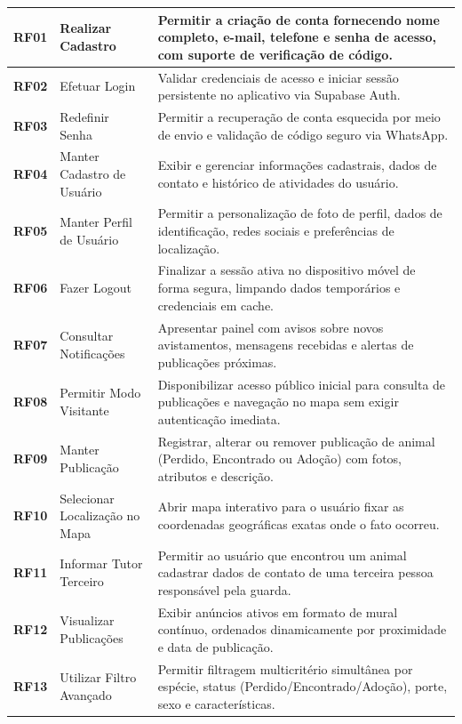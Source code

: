{\begin{longtable}{|>{\centering\arraybackslash}p{1.3cm}|>{\raggedright\arraybackslash}p{4.2cm}|>{\raggedright\arraybackslash}p{8.8cm}|}
\textbf{RF01} & Realizar Cadastro & Permitir a criação de conta fornecendo nome completo, e-mail, telefone e senha de acesso, com suporte de verificação de código. \\ \hline
\textbf{RF02} & Efetuar Login & Validar credenciais de acesso e iniciar sessão persistente no aplicativo via Supabase Auth. \\ \hline
\textbf{RF03} & Redefinir Senha & Permitir a recuperação de conta esquecida por meio de envio e validação de código seguro via WhatsApp. \\ \hline
\textbf{RF04} & Manter Cadastro de Usuário & Exibir e gerenciar informações cadastrais, dados de contato e histórico de atividades do usuário. \\ \hline
\textbf{RF05} & Manter Perfil de Usuário & Permitir a personalização de foto de perfil, dados de identificação, redes sociais e preferências de localização. \\ \hline
\textbf{RF06} & Fazer Logout & Finalizar a sessão ativa no dispositivo móvel de forma segura, limpando dados temporários e credenciais em cache. \\ \hline
\textbf{RF07} & Consultar Notificações & Apresentar painel com avisos sobre novos avistamentos, mensagens recebidas e alertas de publicações próximas. \\ \hline
\textbf{RF08} & Permitir Modo Visitante & Disponibilizar acesso público inicial para consulta de publicações e navegação no mapa sem exigir autenticação imediata. \\ \hline
\textbf{RF09} & Manter Publicação & Registrar, alterar ou remover publicação de animal (Perdido, Encontrado ou Adoção) com fotos, atributos e descrição. \\ \hline
\textbf{RF10} & Selecionar Localização no Mapa & Abrir mapa interativo para o usuário fixar as coordenadas geográficas exatas onde o fato ocorreu. \\ \hline
\textbf{RF11} & Informar Tutor Terceiro & Permitir ao usuário que encontrou um animal cadastrar dados de contato de uma terceira pessoa responsável pela guarda. \\ \hline
\textbf{RF12} & Visualizar Publicações & Exibir anúncios ativos em formato de mural contínuo, ordenados dinamicamente por proximidade e data de publicação. \\ \hline
\textbf{RF13} & Utilizar Filtro Avançado & Permitir filtragem multicritério simultânea por espécie, status (Perdido/Encontrado/Adoção), porte, sexo e características. \\ \hline

\end{longtable}}
